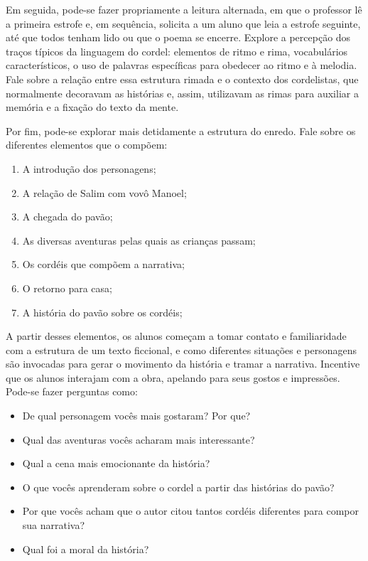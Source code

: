 \documentclass[11pt]{extarticle}
\begin{document}
Em seguida, pode-se fazer propriamente a leitura alternada, em que o professor lê a primeira estrofe e, em sequência, solicita a um aluno que leia a estrofe seguinte, até que todos tenham lido ou que o poema se encerre.
Explore a percepção dos traços típicos da linguagem do cordel: elementos de ritmo e rima, vocabulários característicos, o uso de palavras específicas para obedecer ao ritmo e à melodia. Fale sobre a relação entre essa estrutura rimada e o contexto dos cordelistas, que normalmente decoravam as histórias e, assim, utilizavam as rimas para auxiliar a memória e a fixação do texto da mente.

Por fim, pode-se explorar mais detidamente a estrutura do enredo. Fale sobre os diferentes elementos que o compõem:

\begin{enumerate}
\item A introdução dos personagens;

\item A relação de Salim com vovô Manoel;

\item A chegada do pavão;

\item As diversas aventuras pelas quais as crianças passam;

\item Os cordéis que compõem a narrativa;

\item O retorno para casa;

\item A história do pavão sobre os cordéis;
\end{enumerate}

A partir desses elementos, os alunos começam a tomar contato e familiaridade com a estrutura de um texto ficcional, e como diferentes situações e personagens são invocadas para gerar o movimento da história e tramar a narrativa. Incentive que os alunos interajam com a obra, apelando para seus gostos e impressões.
Pode-se fazer perguntas como:

\begin{itemize}
\item De qual personagem vocês mais gostaram? Por que?

\item Qual das aventuras vocês acharam mais interessante?

\item Qual a cena mais emocionante da história?

\item O que vocês aprenderam sobre o cordel a partir das histórias do pavão?

\item Por que vocês acham que o autor citou tantos cordéis diferentes para compor sua narrativa?

\item Qual foi a moral da história?

\end{itemize}
\end{document}
